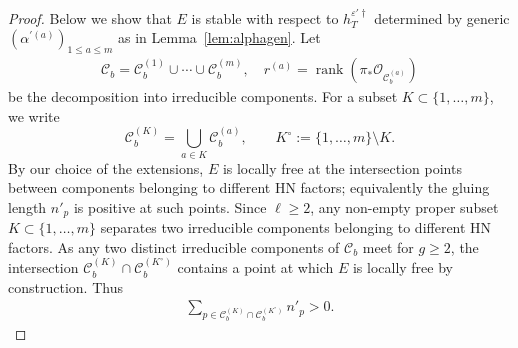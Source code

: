 \documentclass[11pt,oneside,a4paper,mathscr]{amsart}
\theoremstyle{definition}
\renewcommand{\leq}{\leqslant}
\renewcommand{\geq}{\geqslant}
\newcommand{\cC}{\mathcal{C}}
\newcommand{\cO}{\mathcal{O}}
\begin{document}
\begin{proof}
Below we show that $E$ is stable with respect to 
$h_T^{\varepsilon'\dag}$ determined by generic $(\alpha^{'(a)})_{1\leq a\leq m}$ as in Lemma~\ref{lem:alphagen}. 
Let 
\begin{align*}
    \cC_b=\cC_b^{(1)} \cup \cdots \cup \cC_b^{(m)}, \quad 
    r^{(a)}=\operatorname{rank}(\pi_{*}\cO_{\cC_b^{(a)}})
\end{align*}
be the decomposition into irreducible components. 
For a subset $K\subset \{1, \ldots, m\}$, we write 
\[
\cC_b^{(K)}=\bigcup_{a\in K} \cC_b^{(a)}, 
\qquad 
K^{\circ}:=\{1,\ldots,m\}\setminus K.
\]
By our choice of the extensions, \(E\) is locally free at
the intersection points between components belonging to different HN factors;
equivalently the gluing length \(n'_p\) is positive at such points. 
Since \(\ell\geq 2\), any non-empty proper subset \(K\subset \{1, \ldots, m\}\) separates two irreducible
components belonging to different HN factors. As any two distinct irreducible
components of \(\cC_b\) meet for \(g\geq 2\), the intersection
\(\cC_b^{(K)}\cap \cC_b^{(K^{\circ})}\) contains a point at which \(E\) is locally free by
construction. Thus
\begin{align}\label{sum:positive}
\sum_{p\in \cC_b^{(K)}\cap \cC_b^{(K^{\circ})}} n'_p>0.
\end{align}


\end{proof}
\end{document}
